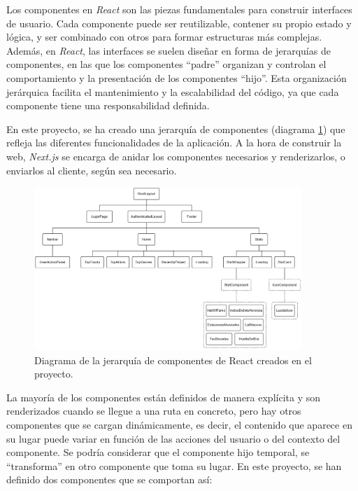 Los componentes en \textit{React} son las piezas fundamentales para construir interfaces de usuario. Cada componente puede ser reutilizable, contener su propio estado y lógica, y ser combinado con otros para formar estructuras más complejas. Además, en \textit{React}, las interfaces se suelen diseñar en forma de jerarquías de componentes, en las que los componentes ``padre'' organizan y controlan el comportamiento y la presentación de los componentes ``hijo''. Esta organización jerárquica facilita el mantenimiento y la escalabilidad del código, ya que cada componente tiene una responsabilidad definida.

En este proyecto, se ha creado una jerarquía de componentes (diagrama \ref{fig:componentes_react}) que refleja las diferentes funcionalidades de la aplicación. A la hora de construir la web, \textit{Next.js} se encarga de anidar los componentes necesarios y renderizarlos, o enviarlos al cliente, según sea necesario.

\begin{figure}[H]
    \centering
    \includegraphics[width=0.9\textwidth]{figures/componentes_react.png}
    \caption{Diagrama de la jerarquía de componentes de React creados en el proyecto.}
    \label{fig:componentes_react}
\end{figure}

La mayoría de los componentes están definidos de manera explícita y son renderizados cuando se llegue a una ruta en concreto, pero hay otros componentes que se cargan dinámicamente, es decir, el contenido que aparece en su lugar puede variar en función de las acciones del usuario o del contexto del componente. Se podría considerar que el componente hijo temporal, se ``transforma'' en otro componente que toma su lugar. En este proyecto, se han definido dos componentes que se comportan así:

